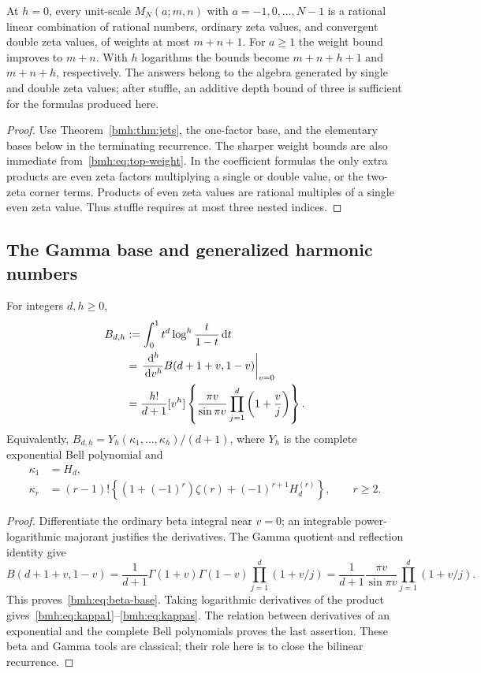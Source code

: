 \begin{corollary}
At $h=0$, every unit-scale $M_N(a;m,n)$ with $a=-1,0,\ldots,N-1$ is a
rational linear combination of rational numbers, ordinary zeta values,
and convergent double zeta values, of weights at most $m+n+1$.
For $a\ge1$ the weight bound improves to $m+n$. With $h$ logarithms the
bounds become $m+n+h+1$ and $m+n+h$, respectively. The answers belong
to the algebra generated by single and double zeta values; after stuffle,
an additive depth bound of three is sufficient for the formulas produced
here.
\end{corollary}
\begin{proof}
Use Theorem~\ref{bmh:thm:jets}, the one-factor base, and the elementary
bases below in the terminating recurrence. The sharper weight bounds
are also immediate from~\eqref{bmh:eq:top-weight}. In the coefficient
formulas the only extra products are even zeta factors multiplying a
single or double value, or the two-zeta corner terms. Products of even
zeta values are rational multiples of a single even zeta value. Thus
stuffle requires at most three nested indices.
\end{proof}

\subsection{The Gamma base and generalized harmonic numbers}
\begin{theorem}\label{bmh:thm:beta-base}
For integers $d,h\ge0$,
\begin{align}
 B_{d,h}&:=\int_0^1t^d\log^h\frac{t}{1-t}\,\mathrm d t\notag\\
 &=\left.\frac{\,\mathrm d^h}{\,\mathrm d v^h}B(d+1+v,1-v)\right|_{v=0}\notag\\
 &=\frac{h!}{d+1}[v^h]\left\{
       \frac{\pi v}{\sin\pi v}\prod_{j=1}^d\left(1+\frac vj\right)
       \right\}.\label{bmh:eq:beta-base}
\end{align}
Equivalently, $B_{d,h}=Y_h(\kappa_1,\ldots,\kappa_h)/(d+1)$, where
$Y_h$ is the complete exponential Bell polynomial and
\begin{align}
 \kappa_1&=H_d,\label{bmh:eq:kappa1}\\
 \kappa_r&=(r-1)!\left\{
 (1+(-1)^r)\zeta(r)+(-1)^{r+1}H_d^{(r)}\right\},\qquad r\ge2.
 \label{bmh:eq:kappas}
\end{align}
\end{theorem}
\begin{proof}
Differentiate the ordinary beta integral near $v=0$; an integrable
power-logarithmic majorant justifies the derivatives. The Gamma quotient
and reflection identity give
\[
 B(d+1+v,1-v)
 =\frac1{d+1}\Gamma(1+v)\Gamma(1-v)
           \prod_{j=1}^d(1+v/j)
 =\frac1{d+1}\frac{\pi v}{\sin\pi v}\prod_{j=1}^d(1+v/j).
\]
This proves~\eqref{bmh:eq:beta-base}. Taking logarithmic derivatives
of the product gives~\eqref{bmh:eq:kappa1}--\eqref{bmh:eq:kappas}.
The relation between derivatives of an exponential and the complete
Bell polynomials proves the last assertion. These beta and Gamma tools
are classical; their role here is to close the bilinear recurrence.
\end{proof}


